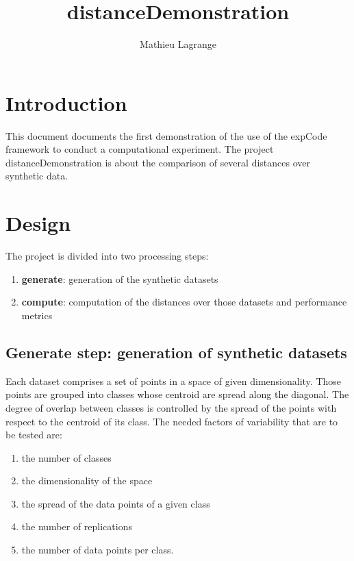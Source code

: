 \documentclass[12pt,a4paper,fleqn]{tufte-handout}
\title{distanceDemonstration}
\author{ Mathieu Lagrange }
\begin{document}
 
  
\maketitle 
  

\section{Introduction}

This document documents the first demonstration of the use of the expCode framework to conduct a computational experiment. The project distanceDemonstration is about the comparison of several distances over synthetic data.



\section{Design}

 The project is divided into two processing steps:
\begin{enumerate}
\item \textbf{generate}: generation of the synthetic datasets
\item \textbf{compute}: computation of the distances over those datasets and performance metrics
\end{enumerate}

\subsection{\textbf{Generate step}: generation of synthetic datasets}

Each dataset comprises a set of points in a space of given dimensionality. Those points are grouped into classes whose centroid are spread along the diagonal. The degree of overlap between classes is controlled by the spread of the points with respect to the centroid of its class. The needed factors of variability that are to be tested are:
\begin{enumerate}
\item the number of classes
\item the dimensionality of the space
\item the spread of the data points of a given class
\item the number of replications
\item the number of data points per class.
\end{enumerate}
\end{document}
